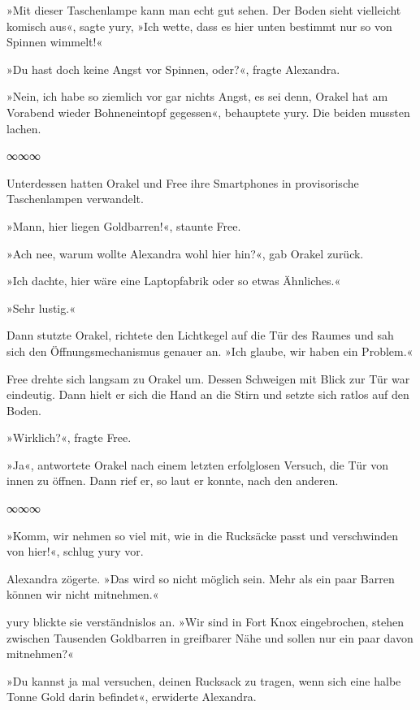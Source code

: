 »Mit dieser Taschenlampe kann man echt gut sehen. Der Boden sieht vielleicht komisch aus«, sagte yury, »Ich wette, dass es hier unten bestimmt nur so von Spinnen wimmelt!«

»Du hast doch keine Angst vor Spinnen, oder?«, fragte Alexandra.

»Nein, ich habe so ziemlich vor gar nichts Angst, es sei denn, Orakel hat am Vorabend wieder Bohneneintopf gegessen«, behauptete yury. Die beiden mussten lachen.

\begin{center}
    ∞∞∞
\end{center}

Unterdessen hatten Orakel und Free ihre Smartphones in provisorische Taschenlampen verwandelt.

»Mann, hier liegen Goldbarren!«, staunte Free.

»Ach nee, warum wollte Alexandra wohl hier hin?«, gab Orakel zurück.

»Ich dachte, hier wäre eine Laptopfabrik oder so etwas Ähnliches.«

»Sehr lustig.«

Dann stutzte Orakel, richtete den Lichtkegel auf die Tür des Raumes und sah sich den Öffnungsmechanismus genauer an. »Ich glaube, wir haben ein Problem.«

Free drehte sich langsam zu Orakel um. Dessen Schweigen mit Blick zur Tür war eindeutig. Dann hielt er sich die Hand an die Stirn und setzte sich ratlos auf den Boden.

»Wirklich?«, fragte Free.

»Ja«, antwortete Orakel nach einem letzten erfolglosen Versuch, die Tür von innen zu öffnen. Dann rief er, so laut er konnte, nach den anderen.

\begin{center}
    ∞∞∞
\end{center}

»Komm, wir nehmen so viel mit, wie in die Rucksäcke passt und verschwinden von hier!«, schlug yury vor.

Alexandra zögerte. »Das wird so nicht möglich sein. Mehr als ein paar Barren können wir nicht mitnehmen.«

yury blickte sie verständnislos an. »Wir sind in Fort Knox eingebrochen, stehen zwischen Tausenden Goldbarren in greifbarer Nähe und sollen nur ein paar davon mitnehmen?«

»Du kannst ja mal versuchen, deinen Rucksack zu tragen, wenn sich eine halbe Tonne Gold darin befindet«, erwiderte Alexandra.

